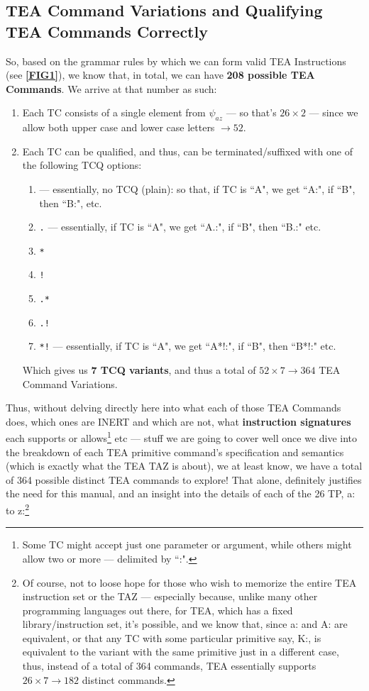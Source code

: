 \documentclass[a4paper, 18pt]{book} %
\begin{document}
\subsection{TEA Command Variations and Qualifying TEA Commands Correctly}

So, based on the grammar rules by which we can form valid TEA Instructions (see \textbf{\autoref{FIG1}}), we know that, in total, we can have \textbf{208 possible TEA Commands}. We arrive at that number as such:

\begin{enumerate}
\item Each TC consists of a single element from $\psi_{az}$ --- so that's $26 \times 2$ --- since we allow both upper case and lower case letters $\rightarrow 52$.
\item{Each TC can be qualified, and thus, can be terminated/suffixed with one of the following TCQ options:

\begin{enumerate}
\item \texttt{} --- essentially, no TCQ (plain): so that, if TC is ``A", we get ``A:", if ``B", then ``B:", etc.
\item \texttt{.} --- essentially, if TC is ``A", we get ``A.:", if ``B", then ``B.:" etc.
\item \texttt{*}
\item \texttt{!}
\item \texttt{.*}
\item \texttt{.!}
\item \texttt{*!} --- essentially, if TC is ``A", we get ``A*!:", if ``B", then ``B*!:" etc.
\end{enumerate}

Which gives us \textbf{7 TCQ variants}, and thus a total of $52 \times 7 \rightarrow 364$ TEA Command Variations.
}
\end{enumerate}

Thus, without delving directly here into what each of those TEA Commands does, which ones are INERT and which are not, what \textbf{instruction signatures} each supports or allows\footnote{Some TC might accept just one parameter or argument, while others might allow two or more --- delimited by ``:".} etc --- stuff we are going to cover well once we dive into the breakdown of each TEA primitive command's specification and semantics (which is exactly what the TEA TAZ is about), we at least know, we have a total of 364 possible distinct TEA commands to explore! That alone, definitely justifies the need for this manual, and an insight into the details of each of the 26 TP, a: to z:\footnote{Of course, not to loose hope for those who wish to memorize the entire TEA instruction set or the TAZ --- especially because, unlike many other programming languages out there, for TEA, which has a fixed library/instruction set, it's possible, and we know that, since a: and A: are equivalent, or that any TC with some particular primitive say, K:, is equivalent to the variant with the same primitive just in a different case, thus, instead of a total of 364 commands, TEA essentially supports $26 \times 7 \rightarrow 182$ distinct commands.}
\end{document}
